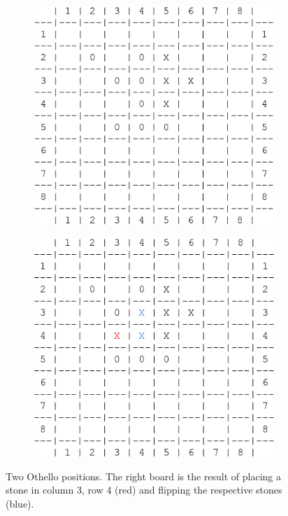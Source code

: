 \begin{figure}[!ht]
    \centering
    \begin{subfigure}[b]{0.48\textwidth}
        \includegraphics[width=1\textwidth]{position1.png}
    \end{subfigure}
    \hfill
    \begin{subfigure}[b]{0.48\textwidth}
        \includegraphics[width=1\textwidth]{position2.png}
    \end{subfigure}
    \caption{Two Othello positions. The right board is the result of placing a stone in column 3, row 4 (red) and flipping the respective stones (blue).}
    \label{fig:boards}
\end{figure}

